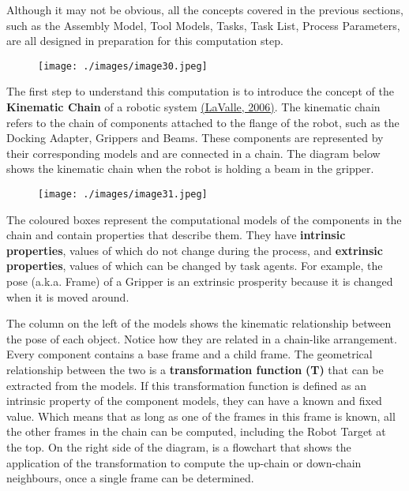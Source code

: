 Although it may not be obvious, all the concepts covered in the previous sections, such as the Assembly Model, Tool Models, Tasks, Task List, Process Parameters, are all designed in preparation for this computation step. 

\begin{figure}[H]
\texttt{[image: ./images/image30.jpeg]}
\end{figure}



The first step to understand this computation is to introduce the concept of the \textbf{Kinematic Chain} of a robotic system \href{https://www.zotero.org/google-docs/?LgUOmG}{(LaValle, 2006)}. The kinematic chain refers to the chain of components attached to the flange of the robot, such as the Docking Adapter, Grippers and Beams. These components are represented by their corresponding models and are connected in a chain. The diagram below shows the kinematic chain when the robot is holding a beam in the gripper. 

\begin{figure}[H]
\texttt{[image: ./images/image31.jpeg]}
\end{figure}


The coloured boxes represent the computational models of the components in the chain and contain properties that describe them. They have \textbf{intrinsic properties}, values of which do not change during the process, and \textbf{extrinsic properties}, values of which can be changed by task agents. For example, the pose (a.k.a. Frame) of a Gripper is an extrinsic prosperity because it is changed when it is moved around. 

The column on the left of the models shows the kinematic relationship between the pose of each object. Notice how they are related in a chain-like arrangement. Every component contains a base frame and a child frame. The geometrical relationship between the two is a \textbf{transformation function} \textbf{(T) }that can be extracted from the models. If this transformation function is defined as an intrinsic property of the component models, they can have a known and fixed value. Which means that as long as one of the frames in this frame is known, all the other frames in the chain can be computed, including the Robot Target at the top. On the right side of the diagram, is a flowchart that shows the application of the transformation to compute the up-chain or down-chain neighbours, once a single frame can be determined.

